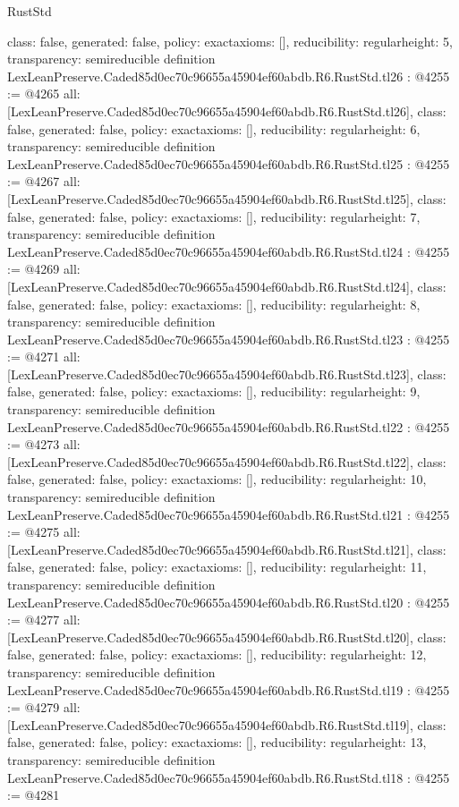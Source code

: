 \begin{lexlean}{RustStd}
\begin{coremodule}
{  class: false,
  generated: false,
  policy: exact{axioms: []},
  reducibility: regular{height: 5},
  transparency: semireducible
}
definition LexLeanPreserve.Caded85d0ec70c96655a45904ef60abdb.R6.RustStd.tl26 : @4255 := @4265 {
  all: [LexLeanPreserve.Caded85d0ec70c96655a45904ef60abdb.R6.RustStd.tl26],
  class: false,
  generated: false,
  policy: exact{axioms: []},
  reducibility: regular{height: 6},
  transparency: semireducible
}
definition LexLeanPreserve.Caded85d0ec70c96655a45904ef60abdb.R6.RustStd.tl25 : @4255 := @4267 {
  all: [LexLeanPreserve.Caded85d0ec70c96655a45904ef60abdb.R6.RustStd.tl25],
  class: false,
  generated: false,
  policy: exact{axioms: []},
  reducibility: regular{height: 7},
  transparency: semireducible
}
definition LexLeanPreserve.Caded85d0ec70c96655a45904ef60abdb.R6.RustStd.tl24 : @4255 := @4269 {
  all: [LexLeanPreserve.Caded85d0ec70c96655a45904ef60abdb.R6.RustStd.tl24],
  class: false,
  generated: false,
  policy: exact{axioms: []},
  reducibility: regular{height: 8},
  transparency: semireducible
}
definition LexLeanPreserve.Caded85d0ec70c96655a45904ef60abdb.R6.RustStd.tl23 : @4255 := @4271 {
  all: [LexLeanPreserve.Caded85d0ec70c96655a45904ef60abdb.R6.RustStd.tl23],
  class: false,
  generated: false,
  policy: exact{axioms: []},
  reducibility: regular{height: 9},
  transparency: semireducible
}
definition LexLeanPreserve.Caded85d0ec70c96655a45904ef60abdb.R6.RustStd.tl22 : @4255 := @4273 {
  all: [LexLeanPreserve.Caded85d0ec70c96655a45904ef60abdb.R6.RustStd.tl22],
  class: false,
  generated: false,
  policy: exact{axioms: []},
  reducibility: regular{height: 10},
  transparency: semireducible
}
definition LexLeanPreserve.Caded85d0ec70c96655a45904ef60abdb.R6.RustStd.tl21 : @4255 := @4275 {
  all: [LexLeanPreserve.Caded85d0ec70c96655a45904ef60abdb.R6.RustStd.tl21],
  class: false,
  generated: false,
  policy: exact{axioms: []},
  reducibility: regular{height: 11},
  transparency: semireducible
}
definition LexLeanPreserve.Caded85d0ec70c96655a45904ef60abdb.R6.RustStd.tl20 : @4255 := @4277 {
  all: [LexLeanPreserve.Caded85d0ec70c96655a45904ef60abdb.R6.RustStd.tl20],
  class: false,
  generated: false,
  policy: exact{axioms: []},
  reducibility: regular{height: 12},
  transparency: semireducible
}
definition LexLeanPreserve.Caded85d0ec70c96655a45904ef60abdb.R6.RustStd.tl19 : @4255 := @4279 {
  all: [LexLeanPreserve.Caded85d0ec70c96655a45904ef60abdb.R6.RustStd.tl19],
  class: false,
  generated: false,
  policy: exact{axioms: []},
  reducibility: regular{height: 13},
  transparency: semireducible
}
definition LexLeanPreserve.Caded85d0ec70c96655a45904ef60abdb.R6.RustStd.tl18 : @4255 := @4281 {
}
\end{coremodule}
\end{lexlean}
